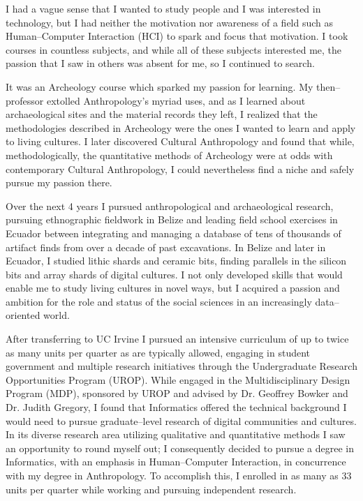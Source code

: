 \documentclass[12pt]{article}
\begin{document}
I had a vague sense that I wanted to study people and I was interested in technology,
but I had neither the motivation nor awareness of a field such as Human--Computer Interaction (HCI) to spark and focus that motivation.
I took courses in countless subjects, and
while all of these subjects interested me,
the passion that I saw in others was absent for me,
so I continued to search.

It was an Archeology course which sparked my passion for learning.
My then--professor extolled Anthropology's myriad uses,
and as I learned about archaeological sites and the material records they left,
I realized that the methodologies described in Archeology were the ones I wanted to learn and apply to living cultures.
I later discovered Cultural Anthropology
and found that while, methodologically, the quantitative methods of Archeology were at odds with contemporary Cultural Anthropology,
I could nevertheless find a niche and safely pursue my passion there.

Over the next 4 years I pursued anthropological and archaeological research,
pursuing ethnographic fieldwork in Belize and leading field school exercises in Ecuador between integrating and managing a database of tens of thousands of artifact finds from over a decade of past excavations.
In Belize and later in Ecuador,
I studied lithic shards and ceramic bits,
finding parallels in the silicon bits and array shards of digital cultures.
I not only developed skills that would enable me to study living cultures in novel ways,
but I acquired a passion and ambition for the role and status of the social sciences in an increasingly data--oriented world.

After transferring to UC Irvine I pursued an intensive curriculum of up to twice as many units per quarter as are typically allowed,
engaging in student government and multiple research initiatives through the Undergraduate Research Opportunities Program (UROP).
While engaged in the Multidisciplinary Design Program (MDP),
sponsored by UROP and advised by Dr.
Geoffrey Bowker and Dr.
Judith Gregory,
I found that Informatics offered the technical background I would need to pursue graduate--level research of digital communities and cultures.
In its diverse research area utilizing qualitative and quantitative methods I saw an opportunity to round myself out;
I consequently decided to pursue a degree in Informatics,
with an emphasis in Human--Computer Interaction,
in concurrence with my degree in Anthropology.
To accomplish this,
I enrolled in as many as 33 units per quarter while working and pursuing independent research.
\end{document}
